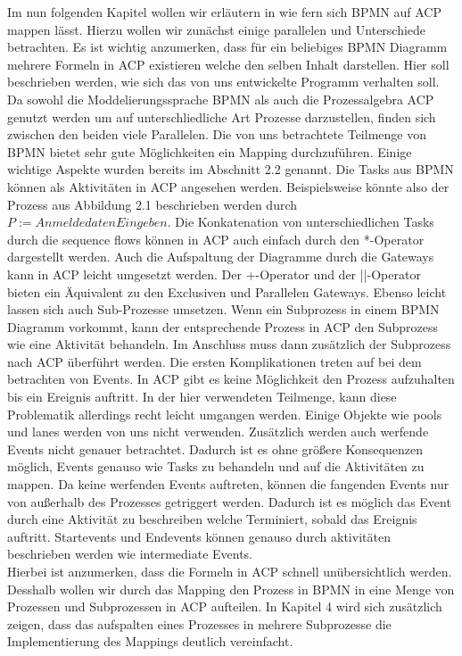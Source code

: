 Im nun folgenden Kapitel wollen wir erläutern in wie fern sich BPMN auf ACP mappen lässt. Hierzu wollen wir zunächst einige parallelen und Unterschiede betrachten. Es ist wichtig anzumerken, dass für ein beliebiges BPMN Diagramm mehrere Formeln in ACP existieren welche den selben Inhalt darstellen. Hier soll beschrieben werden, wie sich das von uns entwickelte Programm verhalten soll.\\
Da sowohl die Moddelierungssprache BPMN als auch die Prozessalgebra ACP genutzt werden um auf unterschliedliche Art Prozesse darzustellen, finden sich zwischen den beiden viele Parallelen. Die von uns betrachtete Teilmenge von BPMN bietet sehr gute Möglichkeiten ein Mapping durchzuführen. Einige wichtige Aspekte wurden bereits im Abschnitt 2.2 genannt. Die Tasks aus BPMN können als Aktivitäten in ACP angesehen werden. Beispielsweise könnte also der Prozess aus Abbildung 2.1 beschrieben werden durch $P:=AnmeldedatenEingeben.$ Die Konkatenation von unterschiedlichen Tasks durch die sequence flows können in ACP auch einfach durch den *-Operator dargestellt werden. Auch die Aufspaltung der Diagramme durch die Gateways kann in ACP leicht umgesetzt werden. Der +-Operator und der ||-Operator bieten ein Äquivalent zu den Exclusiven und Parallelen Gateways. Ebenso leicht lassen sich auch Sub-Prozesse umsetzen. Wenn ein Subprozess in einem BPMN Diagramm vorkommt, kann der entsprechende Prozess in ACP den Subprozess wie eine Aktivität behandeln. Im Anschluss muss dann zusätzlich der Subprozess nach ACP überführt werden.
Die ersten Komplikationen treten auf bei dem betrachten von Events. In ACP gibt es keine Möglichkeit den Prozess aufzuhalten bis ein Ereignis auftritt. In der hier verwendeten Teilmenge, kann diese Problematik allerdings recht leicht umgangen werden. Einige Objekte wie pools und lanes werden von uns nicht verwenden. Zusätzlich werden auch werfende Events nicht genauer betrachtet. Dadurch ist es ohne größere Konsequenzen möglich, Events genauso wie Tasks zu behandeln und auf die Aktivitäten zu mappen. Da keine werfenden Events auftreten, können die fangenden Events nur von außerhalb des Prozesses getriggert werden. Dadurch ist es möglich das Event durch eine Aktivität zu beschreiben welche Terminiert, sobald das Ereignis auftritt. Startevents und Endevents können genauso durch aktivitäten beschrieben werden wie intermediate Events. \\
Hierbei ist anzumerken, dass die Formeln in ACP schnell unübersichtlich werden. Desshalb wollen wir durch das Mapping den Prozess in BPMN in eine Menge von Prozessen und Subprozessen in ACP aufteilen. In Kapitel 4 wird sich zusätzlich zeigen, dass das aufspalten eines Prozesses in mehrere Subprozesse die Implementierung des Mappings deutlich vereinfacht.\\
